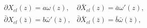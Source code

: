 \begin{equation}
\begin{array}{ll}
\partial X_{cl}(z)= a\omega(z), & \partial \bar{X}_{cl}(z)=\bar{a}
\omega'(z), \\
\bar{\partial} X_{cl}(\bar{z})= b\bar{\omega}'(\bar{z}), & \bar{\partial} \bar{X}_{cl}(\bar{z})=\bar{b}\bar{\omega}(\bar{z}),
\end{array}
\end{equation}

